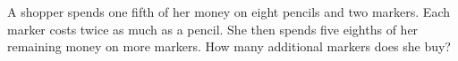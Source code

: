 A shopper spends one fifth of her money on eight pencils and two markers. Each marker costs twice as much as a pencil. She then spends five eighths of her remaining money on more markers. How many additional markers does she buy?
